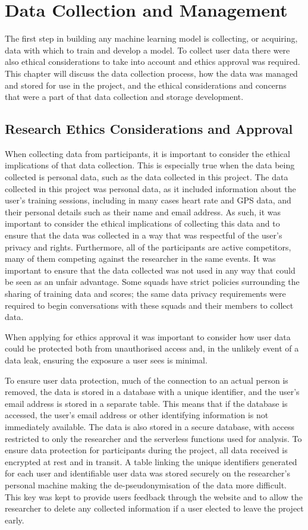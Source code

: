 \chapter{\label{chap:data-collect-mng}Data Collection and Management}
The first step in building any machine learning model is collecting, or acquiring, data with which to train and develop a model. To collect user data there were also ethical considerations to take into account and ethics approval was required. This chapter will discuss the data collection process, how the data was managed and stored for use in the project, and the ethical considerations and concerns that were a part of that data collection and storage development.

\section{Research Ethics Considerations and Approval}
When collecting data from participants, it is important to consider the ethical implications of that data collection. This is especially true when the data being collected is personal data, such as the data collected in this project. The data collected in this project was personal data, as it included information about the user's training sessions, including in many cases heart rate and GPS data, and their personal details such as their name and email address. As such, it was important to consider the ethical implications of collecting this data and to ensure that the data was collected in a way that was respectful of the user's privacy and rights. Furthermore, all of the participants are active competitors, many of them competing against the researcher in the same events. It was important to ensure that the data collected was not used in any way that could be seen as an unfair advantage. Some squads have strict policies surrounding the sharing of training data and scores; the same data privacy requirements were required to begin conversations with these squads and their members to collect data. 

When applying for ethics approval it was important to consider how user data could be protected both from unauthorised access and, in the unlikely event of a data leak, ensuring the exposure a user sees is minimal.

To ensure user data protection, much of the connection to an actual person is removed, the data is stored in a database with a unique identifier, and the user's email address is stored in a separate table. This means that if the database is accessed, the user's email address or other identifying information is not immediately available. The data is also stored in a secure database, with access restricted to only the researcher and the serverless functions used for analysis. To ensure data protection for participants during the project, all data received is encrypted at rest and in transit. A table linking the unique identifiers generated for each user and identifiable user data was stored securely on the researcher's personal machine making the de-pseudonymisation of the data more difficult. This key was kept to provide users feedback through the website and to allow the researcher to delete any collected information if a user elected to leave the project early.

